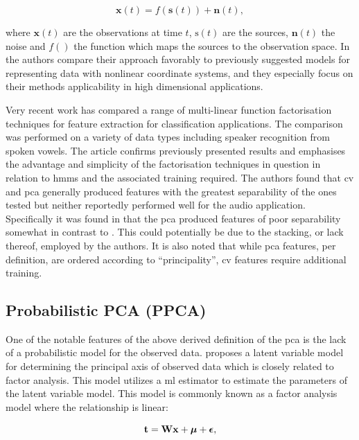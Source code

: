 \begin{equation}\label{eq:nonlinear}
\textbf{x}(t) = f\left(\textbf{s}(t)\right) + \textbf{n}\left(t\right),
\end{equation}

where $\textbf{x}(t)$ are the observations at time $t$, $\text{s}(t)$ are the sources, $\textbf{n}(t)$ the noise and $f()$ the function which maps the sources to the observation space. In \cite{Lappalainen2000} the authors compare their approach favorably to previously suggested models for representing data with nonlinear coordinate systems, and they especially focus on their methods applicability in high dimensional applications.

Very recent work has compared a range of multi-linear function factorisation techniques for feature extraction for classification applications\cite{Burke2013}. The comparison was performed on a variety of data types including speaker recognition from spoken vowels. The article confirms previously presented results and emphasises the advantage and simplicity of the factorisation techniques in question in relation to \gls{hmm}s and the associated training required. The authors found that \gls{cv} and \gls{pca} generally produced features with the greatest separability of the ones tested but neither reportedly performed well for the audio application. Specifically it was found in \cite{Burke2013} that the \gls{pca} produced features of poor separability somewhat in contrast to \cite{Raychaudhuri2000}. This could potentially be due to the stacking, or lack thereof, employed by the authors. It is also noted that while \gls{pca} features, per definition, are ordered according to ``principality'', \gls{cv} features require additional training\cite{Burke2013}.

\subsection{Probabilistic PCA (PPCA)}
One of the notable features of the above derived definition of the \gls{pca} is the lack of a probabilistic model for the observed data. \cite{Tipping1999} proposes a latent variable model for determining the principal axis of observed data which is closely related to factor analysis. This model utilizes a \gls{ml} estimator to estimate the parameters of the latent variable model. This model is commonly known as a factor analysis model where the relationship is linear:

\begin{equation}\label{eq:facAn}
\textrm{\textbf{t}} = \textrm{\textbf{W}}\textrm{\textbf{x}} + \boldsymbol\mu + \boldsymbol\epsilon,
\end{equation}

